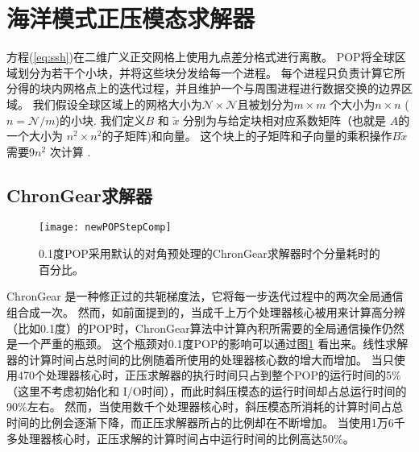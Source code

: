\section{海洋模式正压模态求解器}
\label{sec:baro1}
方程(\ref{eq:ssh})在二维广义正交网格上使用九点差分格式进行离散。  
POP将全球区域划分为若干个小块，并将这些块分发给每一个进程。
每个进程只负责计算它所分得的块内网格点上的迭代过程，并且维护一个与周围进程进行数据交换的边界区域。 
我们假设全球区域上的网格大小为$\mathcal{N}\times
\mathcal{N}$且被划分为$m\times m$ 个大小为$n\times n$ ($n=\mathcal{N}/m$)的小块.
我们定义$B$ 和 $\tilde{x}$ 分别为与给定块相对应系数矩阵（也就是 $A$的一个大小为 $n^2\times n^2$的子矩阵)和向量。
这个块上的子矩阵和子向量的乘积操作$B\tilde{x}$ 需要$9n^2$ 次计算 \cite{hu2013scalable}.
\subsection{ChronGear求解器}
\begin {figure}[!t]
\centering
\texttt{[image: newPOPStepComp]}
\caption[] {0.1度POP采用默认的对角预处理的ChronGear求解器时个分量耗时的百分比。\label{fig:StepComp}}
\end{figure}

ChronGear \cite{dAzevedo1999lapack} 是一种修正过的共轭梯度法，它将每一步迭代过程中的两次全局通信组合成一次。
然而，如前面提到的，当成千上万个处理器核心被用来计算高分辨（比如0.1度）的POP时，ChronGear算法中计算內积所需要的全局通信操作仍然是一个严重的瓶颈。
这个瓶颈对0.1度POP的影响可以通过图\ref{fig:StepComp} 看出来。线性求解器的计算时间占总时间的比例随着所使用的处理器核心数的增大而增加。
当只使用470个处理器核心时，正压求解器的执行时间只占到整个POP的运行时间的5\% （这里不考虑初始化和 I/O时间），而此时斜压模态的运行时间却占总运行时间的90\%左右。
然而，当使用数千个处理器核心时，斜压模态所消耗的计算时间占总时间的比例会逐渐下降，而正压求解器所占的比例却在不断增加。
当使用1万6千多处理器核心时，正压求解的计算时间占中运行时间的比例高达50\%。 

